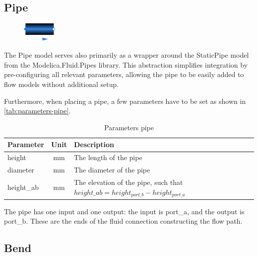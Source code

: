 \documentclass[we,final,11pt,oneside,openany]{uantwerpenbamathesis}
\begin{document}
\subsection{Pipe}
\label{subsec:pipe}

\begin{figure}
    \centering
    \includegraphics[width=0.15\textwidth]{Images/components/pipe}
\end{figure}

The Pipe model serves also primarily as a wrapper around the StaticPipe model from the Modelica.Fluid.Pipes library.
This abstraction simplifies integration by pre-configuring all relevant parameters, allowing the pipe to be easily added to flow models without additional setup.

Furthermore, when placing a pipe, a few parameters have to be set as shown in \autoref{tab:parameters-pipe}.
\begin{table}[h!]
    \centering
    \begin{tabular}{|lcl|}
        \hline
        \multicolumn{1}{|l|}{\textbf{Parameter}}     & \multicolumn{1}{c|}{\textbf{Unit}} & \textbf{Description}                                                                    \\ \hline
        \multicolumn{1}{|l|}{height}                 & \multicolumn{1}{c|}{mm}            & The length of the pipe                                                                  \\ \hline
        \multicolumn{1}{|l|}{diameter}               & \multicolumn{1}{c|}{mm}            & The diameter of the pipe                                                                \\ \hline
        \multicolumn{1}{|l|}{height\_ab}             & \multicolumn{1}{c|}{mm}            & The elevation of the pipe, such that $height\_ab = height_{port\_b} - height_{port\_a}$ \\ \hline
    \end{tabular}
    \caption{Parameters pipe}
    \label{tab:parameters-pipe}
\end{table}

The pipe has one input and one output: the input is port\_a, and the output is port\_b.
These are the ends of the fluid connection constructing the flow path.

\subsection{Bend}
\label{subsec:bend}
\end{document}
